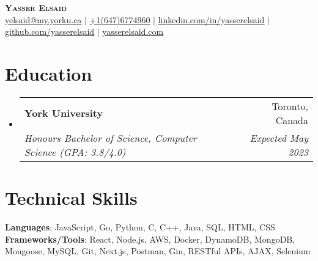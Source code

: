 \documentclass[letterpaper,11pt]{article}
\makeatletter
\newcommand{\resumeSubheading}[4]{
  \vspace{-2pt}\item
    \begin{tabular*}{0.97\textwidth}[t]{l@{\extracolsep{\fill}}r}
      \textbf{#1} & #2 \\
      \textit{\small#3} & \textit{\small #4} \\
    \end{tabular*}\vspace{-7pt}
}
\newcommand{\resumeSubHeadingListStart}{\begin{itemize}[leftmargin=0.15in, label={}]}
\newcommand{\resumeSubHeadingListEnd}{\end{itemize}}
\makeatother
\begin{document}

\begin{center}
    \textbf{\Huge \scshape Yasser Elsaid} \\ \vspace{1pt}
     \href{mailto:yelsaid@my.yorku.ca}{\underline{yelsaid@my.yorku.ca}} $|$ 
     \underline{+1(647)6774960} $|$ 
    \href{https://linkedin.com/in/yasserelsaid}{\underline{linkedin.com/in/yasserelsaid}} $|$
    \href{https://github.com/yasserelsaid}{\underline{github.com/yasserelsaid}} $|$
    \href{https://yasserelsaid.com}{\underline{yasserelsaid.com}}

\end{center}


\section{Education}
  \resumeSubHeadingListStart
    \resumeSubheading
      {York University}{Toronto, Canada}
      {Honours Bachelor of Science, Computer Science (GPA: 3.8/4.0)}{Expected May 2023}
   
  \resumeSubHeadingListEnd

\section{Technical Skills}
\begin{itemize}[leftmargin=0.15in, label={}]
   \small{\item{
    \textbf{Languages}{: JavaScript, Go, Python, C, C++, Java, SQL, HTML, CSS} \\
    \textbf{Frameworks/Tools}{: React, Node.js, AWS, Docker, DynamoDB, MongoDB, Mongoose, MySQL, Git, Next.js, Postman, Gin, RESTful APIs, AJAX, Selenium } \\
   }}
\end{itemize}


\end{document}
